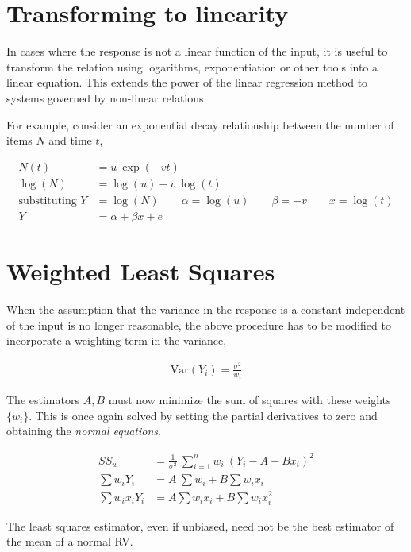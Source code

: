 \section{Transforming to linearity}

In cases where the response is not a linear function of the input, it is useful to transform the relation using logarithms, exponentiation or other tools into a linear equation. This extends the power of the linear regression method to systems governed by non-linear relations.

For example, consider an exponential decay relationship between the number of items $ N $ and time $ t $,

\begin{align}
	N(t) &= u\ \exp(-vt) \nonumber \\
	\log(N) &= \log(u) - v\ \log(t) \nonumber \\
	\text{substituting }Y &= \log(N) \qquad \alpha = \log(u) \qquad \beta = -v \qquad x = \log(t) \nonumber \\
	Y &= \alpha + \beta x + e \nonumber
\end{align}

\section{Weighted Least Squares}

When the assumption that the variance in the response is a constant independent of the input is no longer reasonable, the above procedure has to be modified to incorporate a weighting term in the variance,

\begin{align}
	\mathrm{Var}(Y_i) = \frac{\sigma^2}{w_i}
\end{align}

The estimators $ A,B$ must now minimize the sum of squares with these weights $ \{w_i\} $. This is once again solved by setting the partial derivatives to zero and obtaining the \textit{normal equations}.

\begin{align}
	SS_w &= \frac{1}{\sigma^2}\ \sum\limits_{i = 1}^{n} w_i\ (Y_i - A - Bx_i)^2 \\
	\sum w_i Y_i & = A\ \sum w_i +B \sum w_i x_i\\
	\sum w_i x_i Y_i & = A \sum w_i x_i +B \sum w_i x_i^2
\end{align}

The least squares estimator, even if unbiased, need not be the best estimator of the mean of a normal RV.

